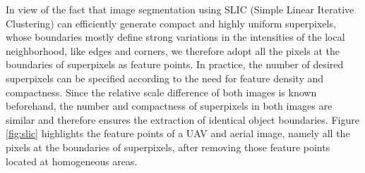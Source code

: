 In view of the fact that image segmentation using SLIC (Simple Linear Iterative Clustering) \cite{achanta2012slic} can efficiently generate compact and highly uniform superpixels, whose boundaries mostly define strong variations in the intensities of the local neighborhood, like edges and corners, we therefore adopt all the pixels at the boundaries of superpixels as feature points.
In practice, the number of desired superpixels can be specified according to the need for feature density and compactness.
Since the relative scale difference of both images is known beforehand, the number and compactness of superpixels in both images are similar and therefore ensures the extraction of identical object boundaries.
Figure \ref{fig:slic} highlights the feature points of a UAV and aerial image, namely all the pixels at the boundaries of superpixels, after removing those feature points located at homogeneous areas.


